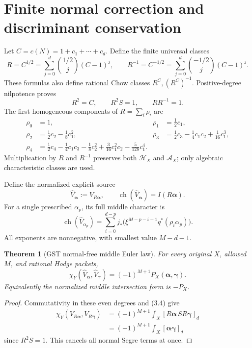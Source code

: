 \documentclass[11pt]{article}
\newcommand{\ch}{\operatorname{ch}}
\newtheorem{theorem}{Theorem}[section]
\begin{document}
\section{Finite normal correction and discriminant conservation}
Let $C=c(N)=1+c_1+\cdots+c_d$. Define the finite universal classes
\[
 R=C^{1/2}=\sum_{j=0}^{d}{1/2\choose j}(C-1)^j,\qquad
 R^{-1}=C^{-1/2}=\sum_{j=0}^{d}{-1/2\choose j}(C-1)^j.
 \tag{4.1}
\]
These formulas also define rational Chow classes $R^C,(R^C)^{-1}$.
Positive-degree nilpotence proves
\[
 R^2=C,\qquad R^2S=1,\qquad RR^{-1}=1.
 \tag{4.2}
\]
The first homogeneous components of $R=\sum_i\rho_i$ are
\[
\begin{aligned}
 \rho_0&=1,& \rho_1&=\tfrac12c_1,\\
 \rho_2&=\tfrac12c_2-\tfrac18c_1^2,&
 \rho_3&=\tfrac12c_3-\tfrac14c_1c_2+\tfrac1{16}c_1^3,\\
 \rho_4&=\tfrac12c_4-\tfrac14c_1c_3-\tfrac18c_2^2
          +\tfrac3{16}c_1^2c_2-\tfrac5{128}c_1^4.
\end{aligned}
 \tag{4.3}
\]
Multiplication by $R$ and $R^{-1}$ preserves both $\mathcal H_X$
and $\mathcal A_X$; only algebraic characteristic classes are used.

Define the normalized explicit source
\[
 \widehat V_{\boldsymbol\alpha}
      :=V_{R\boldsymbol\alpha},\qquad
 \ch(\widehat V_{\boldsymbol\alpha})=I(R\boldsymbol\alpha).
 \tag{4.4}
\]
For a single prescribed $\alpha_p$, its full middle character is
\[
 \ch(\widehat V_{\alpha_p})
    =\sum_{i=0}^{d-p}
       j_*\bigl(\xi^{M-p-i-1}q^*(\rho_i\alpha_p)\bigr).
 \tag{4.5}
\]
All exponents are nonnegative, with smallest value $M-d-1$.

\begin{theorem}[GST normal-free middle Euler law]
For every original $X$, allowed $M$, and rational Hodge packets,
\[
 \boxed{\chi_Y(\widehat V_{\boldsymbol\alpha},
               \widehat V_{\boldsymbol\gamma})
       =(-1)^{M+1}P_X(\boldsymbol\alpha,\boldsymbol\gamma).}
 \tag{4.6}
\]
Equivalently the normalized middle intersection form is $-P_X$.
\end{theorem}
\begin{proof}
Commutativity in these even degrees and (3.4) give
\[
\begin{aligned}
 \chi_Y(V_{R\boldsymbol\alpha},V_{R\boldsymbol\gamma})
 &=(-1)^{M+1}\int_X
       [R\boldsymbol\alpha\,S R\boldsymbol\gamma]_d\\
 &=(-1)^{M+1}\int_X
       [\boldsymbol\alpha\boldsymbol\gamma]_d
\end{aligned}
\]
since $R^2S=1$. This cancels all normal Segre terms at once.
\end{proof}
\end{document}
